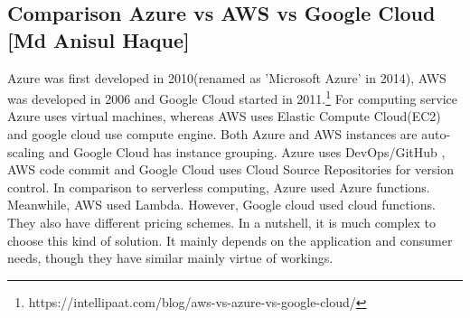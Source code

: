 
%

%
%

%


%
\subsection{Comparison Azure vs AWS vs Google Cloud [Md Anisul Haque]}
%

Azure was first developed in 2010(renamed as 'Microsoft Azure' in 2014), AWS was developed in 2006 and Google Cloud started in 2011.\footnote{https://intellipaat.com/blog/aws-vs-azure-vs-google-cloud/} For computing service Azure uses virtual machines, whereas AWS uses Elastic Compute Cloud(EC2) and google cloud use compute engine. Both Azure and AWS instances are auto-scaling and Google Cloud has instance grouping\cite{articleComparison}. Azure uses DevOps/GitHub , AWS code commit and Google Cloud uses Cloud Source Repositories for version control. In comparison to serverless computing, Azure used Azure functions.
Meanwhile, AWS used Lambda. However, Google cloud used cloud functions. They also have different pricing schemes. In a nutshell, it is much complex to choose this kind of solution. It mainly depends on the application and consumer needs, though they have similar mainly virtue of workings.  

